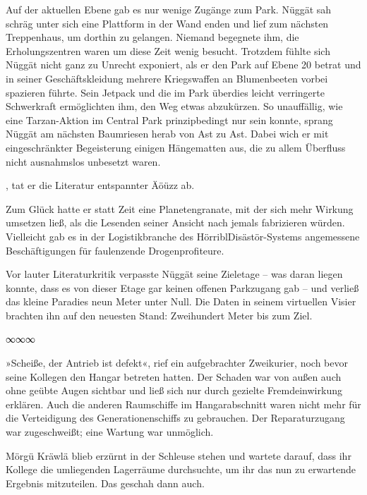 Auf der aktuellen Ebene gab es nur wenige Zugänge zum Park. Nüggät sah schräg unter sich eine Plattform in der Wand enden und lief zum nächsten Treppenhaus, um dorthin zu gelangen. Niemand begegnete ihm, die Erholungszentren waren um diese Zeit wenig besucht. Trotzdem fühlte sich Nüggät nicht ganz zu Unrecht exponiert, als er den Park auf Ebene 20 betrat und in seiner Geschäftskleidung mehrere Kriegswaffen an Blumenbeeten vorbei spazieren führte. Sein Jetpack und die im Park überdies leicht verringerte Schwerkraft ermöglichten ihm, den Weg etwas abzukürzen. So unauffällig, wie eine Tarzan-Aktion im Central Park prinzipbedingt nur sein konnte, sprang Nüggät am nächsten Baumriesen herab von Ast zu Ast. Dabei wich er mit eingeschränkter Begeisterung einigen Hängematten aus, die zu allem Überfluss nicht ausnahmslos unbesetzt waren.

, tat er die Literatur entspannter Äöüzz ab. 

Zum Glück hatte er statt Zeit eine Planetengranate, mit der sich mehr Wirkung umsetzen ließ, als die Lesenden seiner Ansicht nach jemals fabrizieren würden. Vielleicht gab es in der Logistikbranche des HörriblDisästör-Systems angemessene Beschäftigungen für faulenzende Drogenprofiteure.

Vor lauter Literaturkritik verpasste Nüggät seine Zieletage – was daran liegen konnte, dass es von dieser Etage gar keinen offenen Parkzugang gab – und verließ das kleine Paradies neun Meter unter Null. Die Daten in seinem virtuellen Visier brachten ihn auf den neuesten Stand: Zweihundert Meter bis zum Ziel.

\begin{center}
	∞∞∞
\end{center}

»Scheiße, der Antrieb ist defekt«, rief ein aufgebrachter Zweikurier, noch bevor seine Kollegen den Hangar betreten hatten. Der Schaden war von außen auch ohne geübte Augen sichtbar und ließ sich nur durch gezielte Fremdeinwirkung erklären. Auch die anderen Raumschiffe im Hangarabschnitt waren nicht mehr für die Verteidigung des Generationenschiffs zu gebrauchen. Der Reparaturzugang war zugeschweißt; eine Wartung war unmöglich.

Mörgü Kräwlä blieb erzürnt in der Schleuse stehen und wartete darauf, dass ihr Kollege die umliegenden Lagerräume durchsuchte, um ihr das nun zu erwartende Ergebnis mitzuteilen. Das geschah dann auch.

